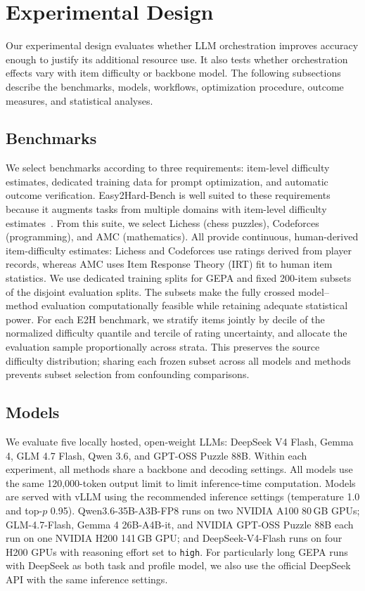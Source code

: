 \documentclass[a4paper]{article}
\theoremstyle{plain}
\theoremstyle{definition}
\theoremstyle{remark}
\begin{document}
\section{Experimental Design}
\label{sec:experimental-design}

Our experimental design evaluates whether LLM orchestration improves accuracy enough to justify its additional resource use. 
It also tests whether orchestration effects vary with item difficulty or backbone model. 
The following subsections describe the benchmarks, models, workflows, optimization procedure, outcome measures, and statistical analyses.

\subsection{Benchmarks}

We select benchmarks according to three requirements: item-level difficulty estimates, dedicated training data for prompt optimization, and automatic outcome verification.
Easy2Hard-Bench is well suited to these requirements because it augments tasks from multiple domains with item-level difficulty estimates~\citep{ding_easy2hard-bench_2024}.
From this suite, we select Lichess (chess puzzles), Codeforces (programming), and AMC (mathematics).
All provide continuous, human-derived item-difficulty estimates: Lichess and Codeforces use ratings derived from player records, whereas AMC uses Item Response Theory (IRT) fit to human item statistics.
We use dedicated training splits for GEPA and fixed 200-item subsets of the disjoint evaluation splits.
The subsets make the fully crossed model--method evaluation computationally feasible while retaining adequate statistical power.
For each E2H benchmark, we stratify items jointly by decile of the normalized difficulty quantile and tercile of rating uncertainty, and allocate the evaluation sample proportionally across strata.
This preserves the source difficulty distribution; sharing each frozen subset across all models and methods prevents subset selection from confounding comparisons.

\subsection{Models}

We evaluate five locally hosted, open-weight LLMs: DeepSeek V4 Flash, Gemma 4, GLM 4.7 Flash, Qwen 3.6, and GPT-OSS Puzzle 88B.
Within each experiment, all methods share a backbone and decoding settings.
All models use the same 120{,}000-token output limit to limit inference-time computation.
Models are served with vLLM using the recommended inference settings (temperature 1.0 and top-$p$ 0.95).
Qwen3.6-35B-A3B-FP8 runs on two NVIDIA A100 80\,GB GPUs; GLM-4.7-Flash, Gemma 4 26B-A4B-it, and NVIDIA GPT-OSS Puzzle 88B each run on one NVIDIA H200 141\,GB GPU; and DeepSeek-V4-Flash runs on four H200 GPUs with reasoning effort set to \texttt{high}.
For particularly long GEPA runs with DeepSeek as both task and profile model, we also use the official DeepSeek API with the same inference settings.
\end{document}

